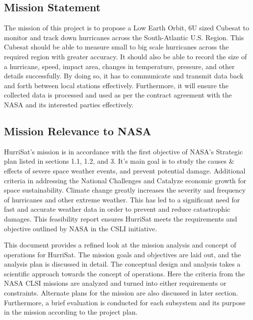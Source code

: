 \subsection{Mission Statement}
The mission of this project is to propose a Low Earth Orbit, 6U sized Cubesat to monitor and track down hurricanes across the South-Atlantic U.S. Region. This Cubesat should be able to measure small to big scale hurricanes across the required region with greater accuracy. It should also be able to record the size of a hurricane, speed, impact area,  changes in temperature, pressure, and other details successfully. By doing so, it has to communicate and transmit data back and forth between local stations effectively. Furthermore, it will ensure the collected data is processed and used as per the contract agreement with the NASA and its interested parties effectively.
\subsection{Mission Relevance to NASA}
HurriSat's mission is in accordance with the first objective of NASA's Strategic plan  \cite{NASA2018} listed in sections 1.1, 1.2, and 3. It's main goal is to study the causes & effects of severe space weather events, and prevent potential damage. Additional criteria in addressing the National Challenges and Catalyze economic growth for space sustainability. Climate change greatly increases the severity and frequency of hurricanes and other extreme weather. This has led to a significant need for fast and accurate weather data in order to prevent and reduce catastrophic damages. This feasibility report ensures HurriSat meets the requirements and objective outlined by NASA in the CSLI \cite{CLSI} initiative.

This document provides a refined look at the mission analysis and concept of operations for HurriSat. The mission goals and objectives are laid out, and the analysis plan is discussed in detail. The conceptual design and analysis takes a scientific approach towards the concept of operations. Here the criteria from the NASA CLSI missions are analyzed and turned into either requirements or constraints. Alternate plans for the mission are also discussed in later section. Furthermore, a brief evaluation is conducted for each subsystem and its purpose in the mission according to the project plan.

